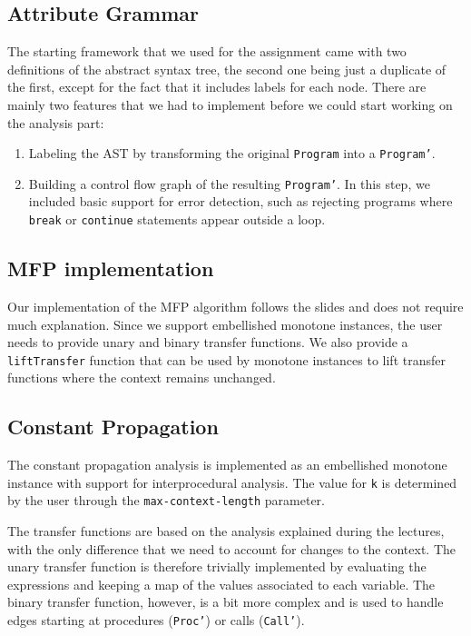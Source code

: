 \documentclass{article}
\begin{document}
\subsection*{Attribute Grammar}

The starting framework that we used for the assignment came with two definitions of the abstract syntax tree, the second one being just a duplicate of the first, except for the fact that it includes labels for each node. There are mainly two features that we had to implement before we could start working on the analysis part:

\begin{enumerate}
	\item Labeling the AST by transforming the original \texttt{Program} into a \texttt{Program'}.
	\item Building a control flow graph of the resulting \texttt{Program'}. In this step, we included basic support for error detection, such as rejecting programs where \texttt{break} or \texttt{continue} statements appear outside a loop.
\end{enumerate}

\subsection*{MFP implementation}

Our implementation of the MFP algorithm follows the slides and does not require much explanation. Since we support embellished monotone instances, the user needs to provide unary and binary transfer functions. We also provide a \texttt{liftTransfer} function that can be used by monotone instances to lift transfer functions where the context remains unchanged.

\subsection*{Constant Propagation}

The constant propagation analysis is implemented as an embellished monotone instance with support for interprocedural analysis. The value for \texttt{k} is determined by the user through the \texttt{max-context-length} parameter.

The transfer functions are based on the analysis explained during the lectures, with the only difference that we need to account for changes to the context. The unary transfer function is therefore trivially implemented by evaluating the expressions and keeping a map of the values associated to each variable. The binary transfer function, however, is a bit more complex and is used to handle edges starting at procedures (\texttt{Proc'}) or calls (\texttt{Call'}).
\end{document}
